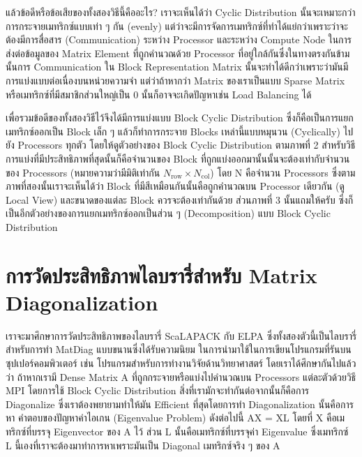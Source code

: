 แล้วข้อดีหรือข้อเสียของทั้งสองวิธีนี้คืออะไร? เราจะเห็นได้ว่า Cyclic Distribution นั้นจะเหมาะกว่าการกระจายเมทริกซ์แบบเท่า ๆ กัน (evenly) 
แต่ว่าจะมีการจัดการเมทริกซ์ที่ทำได้แย่กว่าเพราะว่าจะต้องมีการสื่อสาร (Communication) ระหว่าง Processor และระหว่าง Compute Node 
ในการส่งต่อข้อมูลของ Matrix Element ที่ถูกคำนวณด้วย Processor ที่อยู่ใกล้กันซึ่งในทางตรงกันข้ามนั้นการ Communication ใน Block 
Representation Matrix นั้นจะทำได้ดีกว่าเพราะว่ามันมีการแบ่งแบบต่อเนื่องบนหน่วยความจำ แต่ว่าถ้าหากว่า Matrix ของเราเป็นแบบ Sparse 
Matrix หรือเมทริกซ์ที่มีสมาชิกส่วนใหญ่เป็น 0 นั้นก็อาจจะเกิดปัญหาเช่น Load Balancing ได้ 

เพื่อรวมข้อดีของทั้งสองวิธีไว้จึงได้มีการแบ่งแบบ Block Cyclic Distribution ซึ่งก็คือเป็นการแยกเมทริกซ์ออกเป็น Block เล็ก ๆ แล้วก็ทำการกระจาย 
Blocks เหล่านี้แบบหมุนวน (Cyclically) ไปยัง Processors ทุกตัว โดยให้ดูตัวอย่างของ Block Cyclic Distribution ตามภาพที่ 2
สำหรับวิธีการแบ่งที่มีประสิทธิภาพที่สุดนั้นก็คือจำนวนของ Block ที่ถูกแบ่งออกมานั้นนั้นจะต้องเท่ากับจำนวนของ Processors 
(หมายความว่ามีมิติเท่ากัน $N_{\text{row}} \times N_{\text{col}}$) 
โดย N คือจำนวน Processors ซึ่งตามภาพที่สองนั้นเราจะเห็นได้ว่า Block ที่มีสีเหมือนกันนั้นคือถูกคำนวณบน Processor เดียวกัน (ดู Local View) 
และขนาดของแต่ละ Block ควรจะต้องเท่ากันด้วย ส่วนภาพที่ 3 นั้นแถมให้ครับ ซึ่งก็เป็นอีกตัวอย่างของการแยกเมทริกซ์ออกเป็นส่วน ๆ (Decomposition) 
แบบ Block Cyclic Distribution

\section{การวัดประสิทธิภาพไลบรารี่สำหรับ Matrix Diagonalization}

เราจะมาศึกษาการวัดประสิทธิภาพของไลบรารี่ ScaLAPACK กับ ELPA ซึ่งทั้งสองตัวนี้เป็นไลบรารี่สำหรับการทำ MatDiag แบบขนานซึ่งได้รับความนิยม%
ในการนำมาใช้ในการเขียนโปรแกรมที่รันบนซุปเปอร์คอมพิวเตอร์ เช่น โปรแกรมสำหรับการทำงานวิจัยด้านวิทยาศาสตร์ โดยเราได้ศึกษากันไปแล้วว่า%
ถ้าหากเรามี Dense Matrix A ที่ถูกกระจายหรือแบ่งไปคำนวณบน Processors แต่ละตัวด้วยวิธี MPI โดยการใช้ Block Cyclic Distribution 
สิ่งที่เรามักจะทำกันต่อจากนั้นก็คือการ Diagonalize ซึ่งเราต้องพยายามทำให้มัน Efficient ที่สุดโดยการทำ Diagonalization นั้นคือการหา%
คำตอบของปัญหาค่าไอเกน (Eigenvalue Problem) ดังต่อไปนี้ AX = XL โดยที่ X คือเมทริกซ์ที่บรรจุ Eigenvector ของ A ไว้ ส่วน L 
นั้นคือเมทริกซ์ที่บรรจุค่า Eigenvalue ซึ่งเมทริกซ์ L นี้เองที่เราจะต้องมาทำการหาเพราะมันเป็น Diagonal เมทริกซ์จริง ๆ ของ A 

